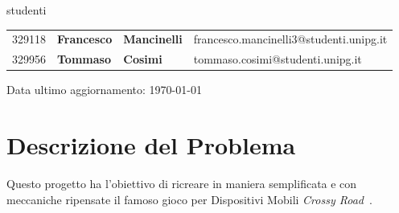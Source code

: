 \documentclass[12pt,a4paper]{report}
\begin{document}
\begin{titlepage}

	\large{studenti}\par
	\vspace{0.2cm}
	\begin{tabular}{ l l l l }
	\large{329118} & \large{\textbf{Francesco}} & \large{\textbf{Mancinelli}} & \large{francesco.mancinelli3@studenti.unipg.it}\\
	\large{329956} & \large{\textbf{Tommaso}} & \large{\textbf{Cosimi}} & \large{tommaso.cosimi@studenti.unipg.it}\\
	\end{tabular}


	\vfill
	\raggedright
	\small{Data ultimo aggiornamento: \today}
\end{titlepage}
\restoregeometry

\tableofcontents

\chapter{Descrizione del Problema}\label{ch:despro}
Questo progetto ha l'obiettivo di ricreare in maniera semplificata e con meccaniche ripensate il famoso gioco per Dispositivi Mobili \emph{Crossy Road}~\cite{wiki:it:CrossyRoad,wiki:en:CrossyRoad}.
\end{document}
